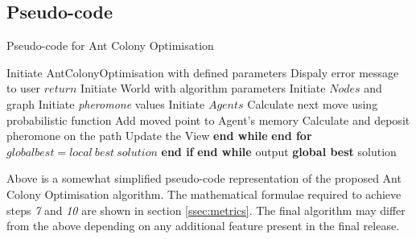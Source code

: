 \subsection{Pseudo-code}
\label{sec:pseudo}
\begin{algorithm}
\caption{Pseudo-code for Ant Colony Optimisation}
\label{aco:pseudo}
\begin{algorithmic}[1]
\State Initiate AntColonyOptimisation with defined parameters
\State Dispaly error message to user
\State $return$
\EndIf
\State Initiate World with algorithm parameters
\State Initiate $Nodes$ and graph
\State Initiate \textit{pheromone} values
\State Initiate $Agents$
\State Calculate next move using probabilistic function 
\State Add moved point to Agent's memory
\State Calculate and deposit pheromone on the path
\State Update the View
\EndWhile 
\State \textbf{end while}
\EndFor 
\State \textbf{end for}
\EndWhile
{}
\State $global best = local\ best\ solution$
\EndIf
\State \textbf{end if}
\State \textbf{end while}
\State output \textbf{global best} solution
\end{algorithmic}
\end{algorithm}

\noindent
Above is a somewhat simplified pseudo-code representation of the proposed Ant Colony Optimisation algorithm. The mathematical formulae required to achieve steps \textit{7} and \textit{10} are shown in section \ref{ssec:metrics}. The final algorithm may differ from the above depending on any additional feature present in the final release.

